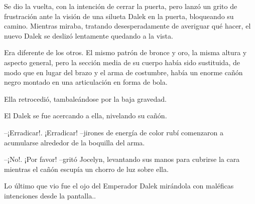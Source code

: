 Se dio la vuelta, con la intención de cerrar la puerta, pero lanzó un grito de frustración ante la visión de una silueta Dalek en la puerta, bloqueando su camino. Mientras miraba, tratando desesperadamente de averiguar qué hacer, el nuevo Dalek se deslizó lentamente quedando a la vista. 

Era diferente de los otros. El mismo patrón de bronce y oro, la misma altura y aspecto general, pero la sección media de su cuerpo había sido sustituida, de modo que en lugar del brazo y el arma de costumbre, había un enorme cañón negro montado en una articulación en forma de bola. 

Ella retrocedió, tambaleándose por la baja gravedad. 

El Dalek se fue acercando a ella, nivelando su cañón. 

--¡Erradicar!. ¡Erradicar! --jirones de energía de color rubí comenzaron a acumularse alrededor de la boquilla del arma. 

--¡No!. ¡Por favor! --gritó Jocelyn, levantando sus manos para cubrirse la cara mientras el cañón escupía un chorro de luz sobre ella. 

Lo último que vio fue el ojo del Emperador Dalek mirándola con maléficas intenciones desde la pantalla..




